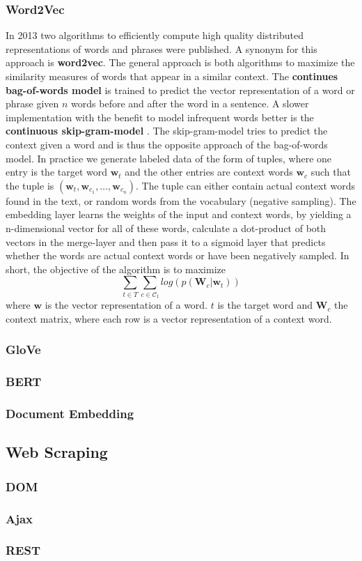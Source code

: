 \subsubsection{Word2Vec}
In 2013 two algorithms to efficiently compute high quality distributed representations of words and phrases were published. A synonym for this approach is \textbf{word2vec}. The general approach is both algorithms to maximize the similarity measures of words that appear in a similar context. The \textbf{continues bag-of-words model} is trained to predict the vector representation of a word or phrase given  $n$ words before and after the word in a sentence. A slower implementation with the benefit to model infrequent words better is the \textbf{continuous skip-gram-model} \citep{word2vec}. The skip-gram-model tries to predict the context given a word and is thus the opposite approach of the bag-of-words model. In practice we generate labeled data of the form of tuples, where one entry is the target word $\mathbf{w}_t$ and the other entries are context words $\mathbf{w}_c$ such that the tuple is $(\mathbf{w}_t, \mathbf{w}_{c_{1}}, \dots, \mathbf{w}_{c_{n}})$. The tuple can either contain actual context words found in the text, or random words from the vocabulary (negative sampling). The embedding layer learns the weights of the input and context words, by yielding a n-dimensional vector for all of these words, calculate a dot-product of both vectors in the merge-layer and then pass it to a sigmoid layer that predicts whether the words are actual context words or have been negatively sampled. In short, the objective of the algorithm is to maximize
\[\sum_{t \in T} \sum_{c \in \mathcal{C}_t} log( p(\mathbf{W}_c|\mathbf{w}_t))\]
where $\mathbf{w}$ is the vector representation of a word. $t$ is the target word and $\mathbf{W}_c$ the context matrix, where each row is a vector representation of a context word.
\subsubsection{GloVe}
\subsubsection{BERT}
\subsubsection{Document Embedding}

\subsection{Web Scraping}
\subsubsection{DOM}
\subsubsection{Ajax}
\subsubsection{REST}

